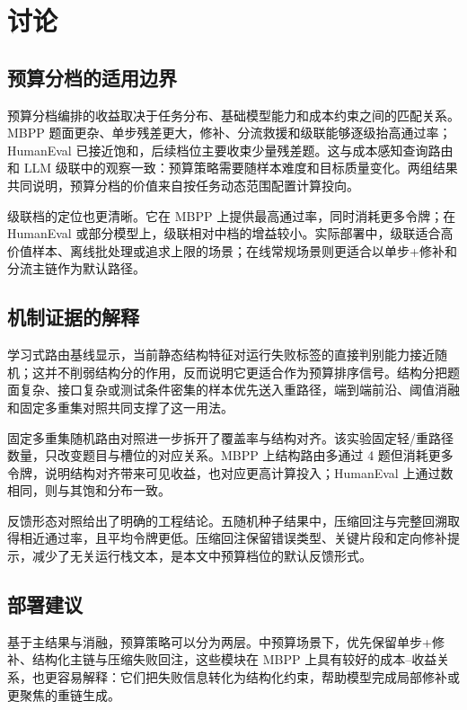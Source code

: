 \section{讨论}
\label{sec:discussion}

\subsection{预算分档的适用边界}

预算分档编排的收益取决于任务分布、基础模型能力和成本约束之间的匹配关系。MBPP 题面更杂、单步残差更大，修补、分流救援和级联能够逐级抬高通过率；HumanEval 已接近饱和，后续档位主要收束少量残差题。这与成本感知查询路由和 LLM 级联中的观察一致：预算策略需要随样本难度和目标质量变化\cite{ding2024hybrid,yue2024cascades}。两组结果共同说明，预算分档的价值来自按任务动态范围配置计算投向。

级联档的定位也更清晰。它在 MBPP 上提供最高通过率，同时消耗更多令牌；在 HumanEval 或部分模型上，级联相对中档的增益较小。实际部署中，级联适合高价值样本、离线批处理或追求上限的场景；在线常规场景则更适合以单步+修补和分流主链作为默认路径。

\subsection{机制证据的解释}

学习式路由基线显示，当前静态结构特征对运行失败标签的直接判别能力接近随机；这并不削弱结构分的作用，反而说明它更适合作为预算排序信号。结构分把题面复杂、接口复杂或测试条件密集的样本优先送入重路径，端到端前沿、阈值消融和固定多重集对照共同支撑了这一用法。

固定多重集随机路由对照进一步拆开了覆盖率与结构对齐。该实验固定轻/重路径数量，只改变题目与槽位的对应关系。MBPP 上结构路由多通过 4 题但消耗更多令牌，说明结构对齐带来可见收益，也对应更高计算投入；HumanEval 上通过数相同，则与其饱和分布一致。

反馈形态对照给出了明确的工程结论。五随机种子结果中，压缩回注与完整回溯取得相近通过率，且平均令牌更低。压缩回注保留错误类型、关键片段和定向修补提示，减少了无关运行栈文本，是本文中预算档位的默认反馈形式。

\subsection{部署建议}

基于主结果与消融，预算策略可以分为两层。中预算场景下，优先保留单步+修补、结构化主链与压缩失败回注，这些模块在 MBPP 上具有较好的成本--收益关系，也更容易解释：它们把失败信息转化为结构化约束，帮助模型完成局部修补或更聚焦的重链生成。

